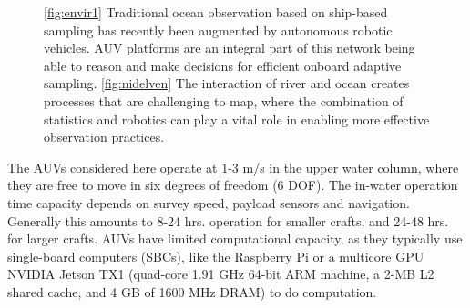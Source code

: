 \documentclass[aoas]{imsart}
\begin{document}
\begin{figure}[!h] 
  \centering 
  \hfill
  \caption{\ref{fig:envir1} Traditional ocean observation based on
    ship-based sampling has recently been augmented by autonomous robotic vehicles. %
    AUV platforms are an integral part of this network being able to reason and make decisions for efficient onboard adaptive sampling. %
    \ref{fig:nidelven} The interaction of river and ocean creates
    processes that are challenging to map, where the combination of
    statistics and robotics can play a vital role in enabling more
    effective observation practices.}
\label{fig:envir}
\end{figure}

The AUVs considered here operate at $1$-$3$ m/s in the upper water column, where they are free to move in six degrees of freedom (6 DOF). The in-water operation time capacity depends on survey speed, payload sensors and navigation. Generally this amounts to 8-24 hrs. operation for smaller crafts, and 24-48 hrs. for larger crafts. AUVs have limited computational capacity, as they typically use single-board computers (SBCs), like the Raspberry Pi or a multicore GPU NVIDIA Jetson TX1 (quad-core 1.91 GHz 64-bit ARM machine, a 2-MB L2 shared cache, and 4 GB of 1600 MHz DRAM) to do computation. 
\end{document}
